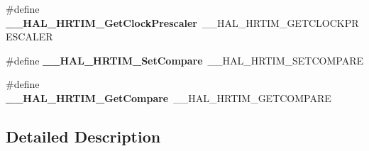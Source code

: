 \begin{DoxyCompactItemize}
\#define {\bfseries \+\_\+\+\_\+\+H\+A\+L\+\_\+\+H\+R\+T\+I\+M\+\_\+\+Get\+Clock\+Prescaler}~\+\_\+\+\_\+\+H\+A\+L\+\_\+\+H\+R\+T\+I\+M\+\_\+\+G\+E\+T\+C\+L\+O\+C\+K\+P\+R\+E\+S\+C\+A\+L\+ER
\item 
\mbox{\label{group___h_a_l___h_r_t_i_m___aliased___macros_ga3a834f00e6fc6eb601cf28f3ecca47d9}} 
\#define {\bfseries \+\_\+\+\_\+\+H\+A\+L\+\_\+\+H\+R\+T\+I\+M\+\_\+\+Set\+Compare}~\+\_\+\+\_\+\+H\+A\+L\+\_\+\+H\+R\+T\+I\+M\+\_\+\+S\+E\+T\+C\+O\+M\+P\+A\+RE
\item 
\mbox{\label{group___h_a_l___h_r_t_i_m___aliased___macros_ga7db344eedd73f9ceccd648e9d43e6ed7}} 
\#define {\bfseries \+\_\+\+\_\+\+H\+A\+L\+\_\+\+H\+R\+T\+I\+M\+\_\+\+Get\+Compare}~\+\_\+\+\_\+\+H\+A\+L\+\_\+\+H\+R\+T\+I\+M\+\_\+\+G\+E\+T\+C\+O\+M\+P\+A\+RE
\end{DoxyCompactItemize}


\subsection{Detailed Description}
